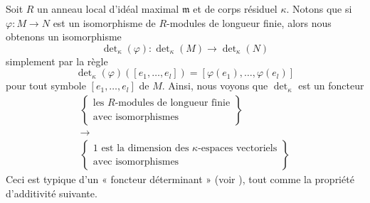 \noindent
Soit $R$ un anneau local d'idéal maximal $\mathfrak m$ et de
corps résiduel $\kappa$. Notons que si $\varphi : M \to N$ est un
isomorphisme de $R$-modules de longueur finie, alors nous obtenons un
isomorphisme
$$
\det\nolimits_\kappa(\varphi) :
\det\nolimits_\kappa(M)
\to
\det\nolimits_\kappa(N)
$$
simplement par la règle
$$
\det\nolimits_\kappa(\varphi)([e_1, \ldots, e_l])
=
[\varphi(e_1), \ldots, \varphi(e_l)]
$$
pour tout symbole $[e_1, \ldots, e_l]$ de $M$.
Ainsi, nous voyons que $\det\nolimits_\kappa$ est un foncteur
\begin{equation}
\label{equation-functor}
\begin{gathered}
\left\{
\begin{matrix}
\text{les }R\text{-modules de longueur finie}\\
\text{avec isomorphismes}
\end{matrix}
\right\} \\
\longrightarrow \\
\left\{
\begin{matrix}
1\text{ est la dimension des }\kappa\text{-espaces vectoriels}\\
\text{avec isomorphismes}
\end{matrix}
\right\}
\end{gathered}
\end{equation}
Ceci est typique d'un « foncteur déterminant »
(voir \cite{Knudsen}), tout comme la propriété d'additivité
suivante.

